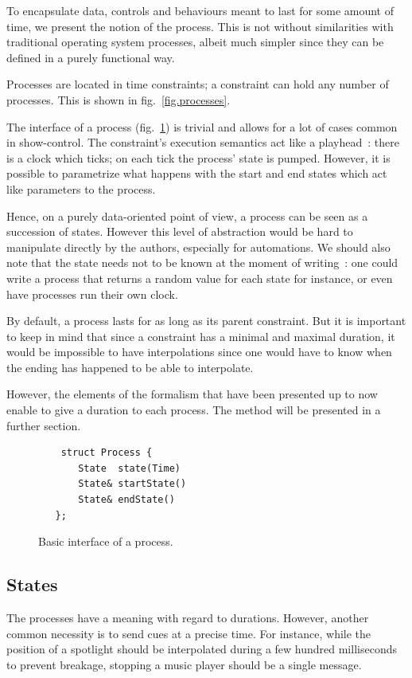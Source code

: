 \documentclass{sigchi}
\begin{document}
To encapsulate data, controls and behaviours meant to last for some amount of time, we present the notion of the process. This is not without similarities with traditional operating system processes, albeit much simpler since they can be defined in a purely functional way.

Processes are located in time constraints; a constraint can hold any number of processes. This is shown in fig.~\ref{fig.processes}.

The interface of a process (fig.~\ref{fig.processInterface}) is trivial and allows for a lot of cases common in show-control. The constraint's execution semantics act like a playhead~: there is a clock which ticks; on each tick the process' state is pumped. However, it is possible to parametrize what happens with the start and end states which act like parameters to the process. 

Hence, on a purely data-oriented point of view, a process can be seen as a succession of states. However this level of abstraction would be hard to manipulate directly by the authors, especially for automations. We should also note that the state needs not to be known at the moment of writing~: one could write a process that returns a random value for each state for instance, or even have processes run their own clock.

By default, a process lasts for as long as its parent constraint. But it is important to keep in mind that since a constraint has a minimal and maximal duration, it would be impossible to have interpolations since one would have to know when the ending has happened to be able to interpolate. 

However, the elements of the formalism that have been presented up to now enable to give a duration to each process. The method will be presented in a further section.

\begin{figure}
	\centering
\begin{lstlisting}
    struct Process {
       State  state(Time)
       State& startState()
       State& endState()
   };
\end{lstlisting}
\caption{Basic interface of a process.}
\label{fig.processInterface}
\end{figure}

\subsection{States}
The processes have a meaning with regard to durations. However, another common necessity is to send cues at a precise time. For instance, while the position of a spotlight should be interpolated during a few hundred milliseconds to prevent breakage, stopping a music player should be a single message.
\end{document}
